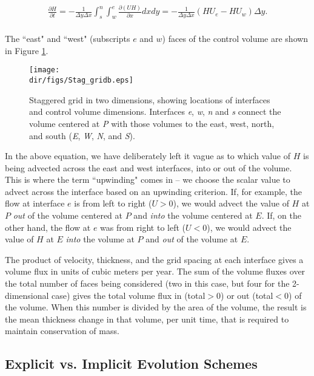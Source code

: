\begin{align*}
\frac{\partial H}{\partial t}=-\frac{1}{\Delta y\Delta x}\int_{s}^{n}{\int_{w}^{e}{\frac{\partial \left( UH \right)}{\partial x}}}dxdy=-\frac{1}{\Delta y\Delta x}\left( HU_{e}-HU_{w} \right)\Delta y. \\
\end{align*}

The ``east" and ``west" (subscripts $e$ and $w$) faces of the control volume are shown in Figure \ref{fig:stag_c_grid2}.

\begin{figure}
  \begin{center}
    \texttt{[image: \\dir/figs/Stag\_gridb.eps]}
  \end{center}
  \caption{Staggered grid in two dimensions, showing locations of interfaces and control volume dimensions. Interfaces \textit{e}, \textit{w}, \textit{n} and \textit{s} connect the volume centered at \textit{P} with those volumes to the east, west, north, and south (\textit{E}, \textit{W}, \textit{N}, and \textit{S}).}
  \label{fig:stag_c_grid2}
\end{figure} 

In the above equation, we have deliberately left it vague as to which value of $H$ is being advected across the east and west interfaces, into or out of the volume. This is where the term ``upwinding" comes in -- we choose the scalar value to advect across the interface based on an upwinding criterion. If, for example, the flow at interface $e$ is from left to right ($U>0$), we would advect the value of $H$ at $P$ \textit{out} of the volume centered at $P$ and \textit{into} the volume centered at $E$. If, on the other hand, the flow at $e$ was from right to left ($U<0$), we would advect the value of $H$ at $E$ \textit{into} the volume at $P$ and \textit{out} of the volume at $E$. 

The product of velocity, thickness, and the grid spacing at each interface gives a volume flux in units of cubic meters per year. The sum of the volume fluxes over the total number of faces being considered (two in this case, but four for the 2-dimensional case) gives the total volume flux in (total$>$0) or out (total$<$0) of the volume. When this number is divided by the area of the volume, the result is the mean thickness change in that volume, per unit time, that is required to maintain conservation of mass.

\subsection{Explicit vs. Implicit Evolution Schemes}

